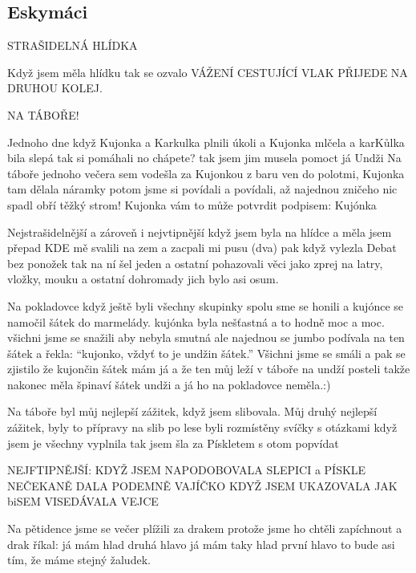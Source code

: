 \subsection*{Eskymáci} %
\label{sub:eskymáci}

\begin{multicols}{2}
	

STRAŠIDELNÁ HLÍDKA

Když jsem měla hlídku tak se ozvalo VÁŽENÍ CESTUJÍCÍ VLAK PŘIJEDE NA DRUHOU KOLEJ.



NA TÁBOŘE!

Jednoho dne když Kujonka a Karkulka plnili úkoli a Kujonka mlčela a karKůlka bila slepá tak si pomáhali no chápete? tak jsem jim musela pomoct já Undži
Na táboře jednoho večera sem vodešla za Kujonkou z baru ven do polotmi, Kujonka tam dělala náramky potom jsme si povídali a povídali, až najednou zničeho nic spadl obří těžký strom! Kujonka vám to může potvrdit podpisem: Kujónka



Nejstrašidelnější a zároveň i nejvtipnější když jsem byla na hlídce a měla jsem přepad KDE mě svalili na zem a zacpali mi pusu (dva) pak když vylezla Debat bez ponožek tak na ní šel jeden a ostatní pohazovali věci jako zprej na latry, vložky, mouku a ostatní dohromady jich bylo asi osum.



Na pokladovce když ještě byli všechny skupinky spolu sme se honili a kujónce se namočil šátek do marmelády. kujónka  byla nešťastná a to hodně moc a moc. všichni jsme se snažili aby nebyla smutná ale najednou se jumbo podívala na ten šátek a řekla: “kujonko, vždyť to je undžin šátek.” Všichni jsme se smáli a pak se zjistilo že kujončin šátek mám já a že ten můj leží v táboře na undží posteli takže nakonec měla špinaví šátek undži a já ho na pokladovce neměla.:)



Na táboře byl můj nejlepší zážitek, když jsem slibovala. Můj druhý nejlepší zážitek, byly to přípravy na slib po lese byli rozmístěny svíčky s otázkami když jsem je všechny vyplnila tak jsem šla za Pískletem s otom popvídat



NEJFTIPNĚJŠÍ: KDYŽ JSEM NAPODOBOVALA SLEPICI a PÍSKLE NEČEKANĚ DALA PODEMNĚ VAJÍČKO KDYŽ JSEM UKAZOVALA JAK biSEM VISEDÁVALA VEJCE 




Na pětidence jsme se večer plížili za drakem protože jsme ho chtěli zapíchnout a drak říkal: já mám hlad druhá hlavo já mám taky hlad první hlavo to bude asi tím, že máme stejný žaludek.



\end{multicols}

